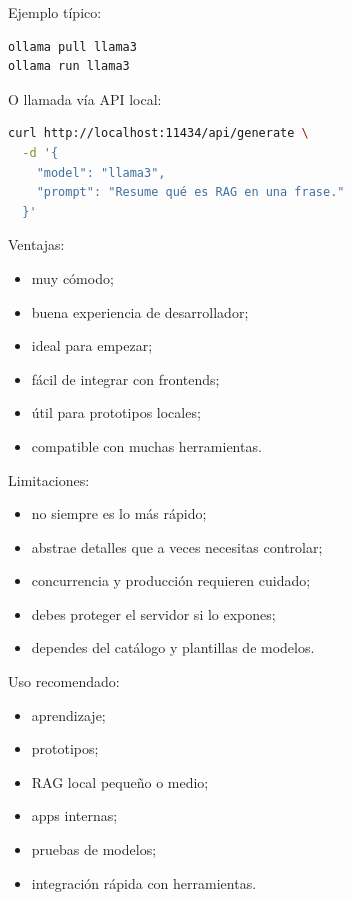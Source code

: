 Ejemplo típico:

\begin{lstlisting}[language=bash]
ollama pull llama3
ollama run llama3
\end{lstlisting}

O llamada vía API local:

\begin{lstlisting}[language=bash]
curl http://localhost:11434/api/generate \
  -d '{
    "model": "llama3",
    "prompt": "Resume qué es RAG en una frase."
  }'
\end{lstlisting}

Ventajas:

\begin{itemize}
\tightlist
\item
  muy cómodo;
\item
  buena experiencia de desarrollador;
\item
  ideal para empezar;
\item
  fácil de integrar con frontends;
\item
  útil para prototipos locales;
\item
  compatible con muchas herramientas.
\end{itemize}

Limitaciones:

\begin{itemize}
\tightlist
\item
  no siempre es lo más rápido;
\item
  abstrae detalles que a veces necesitas controlar;
\item
  concurrencia y producción requieren cuidado;
\item
  debes proteger el servidor si lo expones;
\item
  dependes del catálogo y plantillas de modelos.
\end{itemize}

Uso recomendado:

\begin{itemize}
\tightlist
\item
  aprendizaje;
\item
  prototipos;
\item
  RAG local pequeño o medio;
\item
  apps internas;
\item
  pruebas de modelos;
\item
  integración rápida con herramientas.
\end{itemize}

